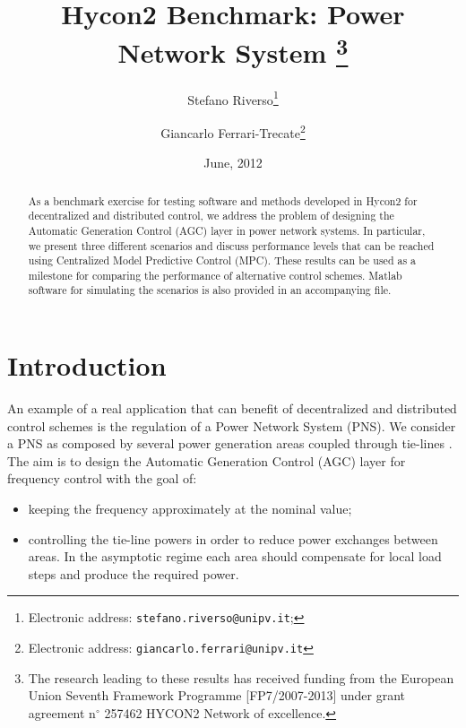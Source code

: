 \documentclass[a4paper]{article}
\begin{document}
     \title{Hycon2 Benchmark: Power Network System \thanks{The research leading to these results has received funding from the European Union Seventh Framework Programme [FP7/2007-2013]  under grant agreement n$^\circ$ 257462 HYCON2 Network of excellence.}}
     \author{Stefano Riverso\thanks{Electronic address: \texttt{stefano.riverso@unipv.it};}} 
     \affil{}

     \author{Giancarlo Ferrari-Trecate\thanks{Electronic address: \texttt{giancarlo.ferrari@unipv.it}}} 

     \date{June, 2012}

     \maketitle 


     \begin{abstract}
       As a benchmark exercise for testing software and methods developed in Hycon2 for decentralized and distributed control, we address the problem of designing the Automatic Generation Control (AGC) layer in power network systems. In particular, we present three different scenarios and discuss performance levels that can be reached using Centralized Model Predictive Control (MPC). These results can be used as a milestone for comparing the performance of alternative control schemes. Matlab software for simulating the scenarios is also provided in an accompanying file.
     \end{abstract}

     \newpage

     \section{Introduction}
          \label{sec:PNS}
          An example of a real application that can benefit of decentralized and distributed control schemes is the regulation of a Power Network System (PNS). We consider a PNS as composed by several power generation areas coupled through tie-lines \cite{Saadat2002}. The aim is to design the Automatic Generation Control (AGC) layer for frequency control with the goal of: 
          \begin{itemize}
          \item keeping the frequency approximately at the nominal value;
          \item controlling the tie-line powers in order to reduce power exchanges between areas. In the asymptotic regime each area should compensate for local load steps and produce the required power.
          \end{itemize}
          
\end{document}
